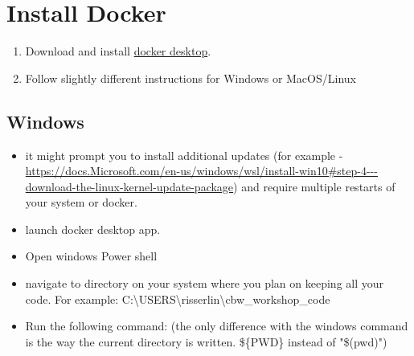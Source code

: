 \documentclass[
]{book}
\newenvironment{Shaded}{\begin{snugshade}}{\end{snugshade}}
\newcommand{\DecValTok}[1]{\textcolor[rgb]{0.00,0.00,0.81}{#1}}
\newcommand{\ErrorTok}[1]{\textcolor[rgb]{0.64,0.00,0.00}{\textbf{#1}}}
\newcommand{\NormalTok}[1]{#1}
\newcommand{\OtherTok}[1]{\textcolor[rgb]{0.56,0.35,0.01}{#1}}
\newcommand{\SpecialCharTok}[1]{\textcolor[rgb]{0.00,0.00,0.00}{#1}}
\providecommand{\tightlist}{%
  \setlength{\itemsep}{0pt}\setlength{\parskip}{0pt}}
\begin{document}
\hypertarget{install-docker}{%
\section{Install Docker}\label{install-docker}}

\begin{enumerate}
\def\labelenumi{\arabic{enumi}.}
\tightlist
\item
  Download and install \href{https://www.docker.com/products/docker-desktop}{docker desktop}.
\item
  Follow slightly different instructions for Windows or MacOS/Linux
\end{enumerate}

\hypertarget{windows}{%
\subsection{Windows}\label{windows}}

\begin{itemize}
\tightlist
\item
  it might prompt you to install additional updates (for example - \url{https://docs.Microsoft.com/en-us/windows/wsl/install-win10\#step-4---download-the-linux-kernel-update-package}) and require multiple restarts of your system or docker.
\item
  launch docker desktop app.
\item
  Open windows Power shell
\item
  navigate to directory on your system where you plan on keeping all your code. For example: C:\textbackslash USERS\textbackslash risserlin\textbackslash cbw\_workshop\_code
\item
  Run the following command: (the only difference with the windows command is the way the current directory is written. \$\{PWD\} instead of "\$(pwd)")
\end{itemize}

\begin{Shaded}
\end{Shaded}
\end{document}
